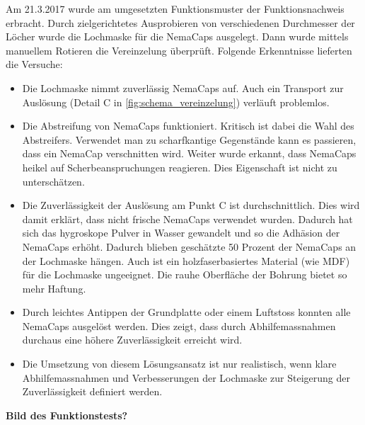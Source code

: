 \newline
Am 21.3.2017 wurde am umgesetzten Funktionsmuster der Funktionsnachweis erbracht. Durch zielgerichtetes Ausprobieren von verschiedenen Durchmesser der Löcher wurde die Lochmaske für die NemaCaps ausgelegt. Dann wurde mittels manuellem Rotieren die Vereinzelung überprüft.
\newline
\newline
Folgende Erkenntnisse lieferten die Versuche:
\begin{itemize}
	\item Die Lochmaske nimmt zuverlässig NemaCaps auf. Auch ein Transport zur Auslösung (Detail C in \ref{fig:schema_vereinzelung}) verläuft problemlos.
	
	\item Die Abstreifung von NemaCaps funktioniert. Kritisch ist dabei die Wahl des Abstreifers. Verwendet man zu scharfkantige Gegenstände kann es passieren, dass ein NemaCap verschnitten wird. Weiter wurde erkannt, dass NemaCaps heikel auf Scherbeanspruchungen reagieren. Dies Eigenschaft ist nicht zu unterschätzen.
		
	\item Die Zuverlässigkeit der Auslösung am Punkt C ist durchschnittlich. Dies wird damit erklärt, dass nicht frische NemaCaps verwendet wurden. Dadurch hat sich das hygroskope Pulver in Wasser gewandelt und so die Adhäsion der NemaCaps erhöht. Dadurch blieben geschätzte 50 Prozent der NemaCaps an der Lochmaske hängen. Auch ist ein holzfaserbasiertes Material (wie MDF) für die Lochmaske ungeeignet. Die rauhe Oberfläche der Bohrung bietet so mehr Haftung.
	
	\item Durch leichtes Antippen der Grundplatte oder einem Luftstoss konnten alle NemaCaps ausgelöst werden. Dies zeigt, dass durch Abhilfemassnahmen durchaus eine höhere Zuverlässigkeit erreicht wird.
	
	\item Die Umsetzung von diesem Lösungsansatz ist nur realistisch, wenn klare Abhilfemassnahmen und Verbesserungen der Lochmaske zur Steigerung der Zuverlässigkeit definiert werden. 
\end{itemize} 
\textbf{Bild des Funktionstests?}


